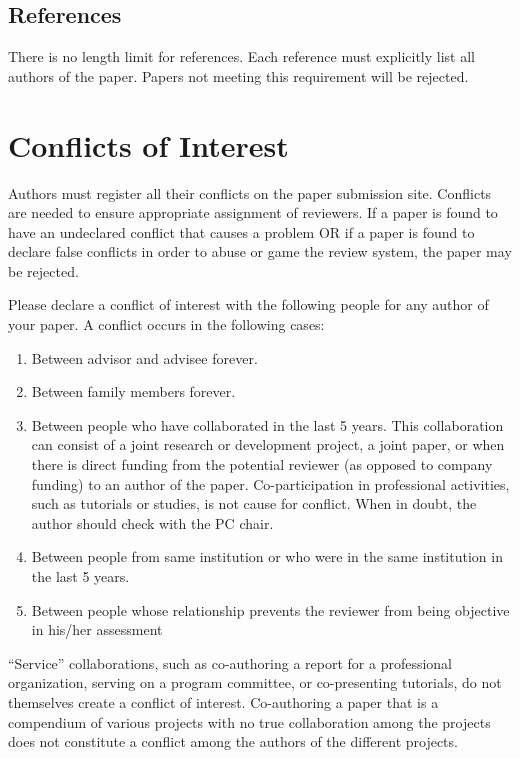 \documentclass{sig-alternate}
\begin{document}
\subsection{References}

There is no length limit for references. Each reference must explicitly list all authors of the paper. Papers not meeting this requirement will be rejected.

\section{Conflicts of Interest}

Authors must register all their conflicts on the paper submission site. Conflicts are needed to ensure appropriate assignment of reviewers. If a paper is found to have an undeclared conflict that causes a problem OR if a paper is found to declare false conflicts in order to abuse or game the review system, the paper may be rejected.

Please declare a conflict of interest with the following people for any author of your paper.
A conflict occurs in the following cases:
\begin{enumerate}
\item Between advisor and advisee forever. 
\item Between family members forever. 
\item Between people who have collaborated in the last 5 years. This collaboration can consist of a joint research or development project, a joint paper, or when there is direct funding from the potential reviewer (as opposed to company funding) to an author of the paper. Co-participation in professional activities, such as tutorials or studies, is not cause for conflict. When in doubt, the author should check with the PC chair. 
\item Between people from same institution or who were in the same institution in the last 5 years. 
\item Between people whose relationship prevents the reviewer from being objective in his/her assessment
\end{enumerate}


``Service'' collaborations, such as co-authoring a report for a professional organization, serving on a program committee, or co-presenting tutorials, do not themselves create a conflict of interest. Co-authoring a paper that is a compendium of various projects with no true collaboration among the projects does not constitute a conflict among the authors of the different projects.
\end{document}
